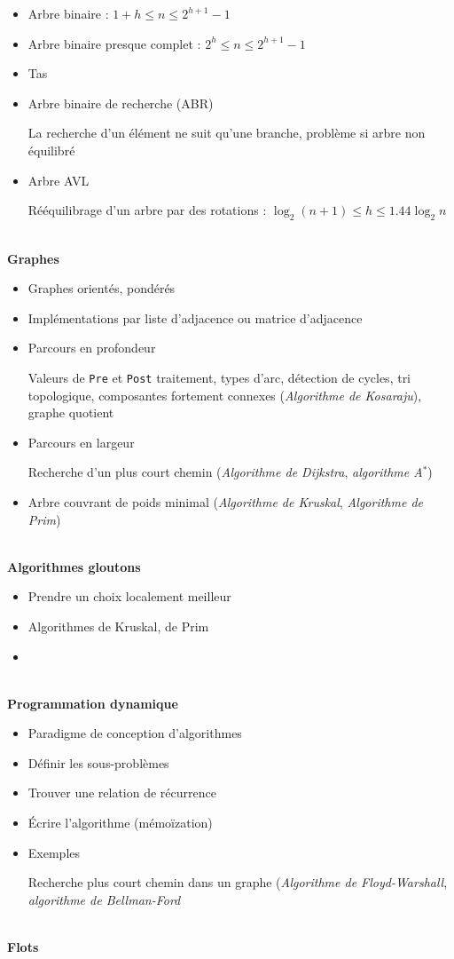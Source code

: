 \documentclass[10pt,a4paper]{article}
\newcommand{\cat}[1]{\noindent \textbf{\Large #1}}
\begin{document}
%
\begin{itemize}[noitemsep]
	\item Arbre binaire : \(  1+h \leq n \leq 2^{h+1}-1  \)
	\item Arbre binaire presque complet : %
		\(  2^h \leq n \leq 2^{h+1}-1  \)
	\item Tas
	\item Arbre binaire de recherche (ABR)
	
		La recherche d'un élément ne suit qu'une branche, problème si arbre non équilibré
	\item Arbre AVL
	
		Rééquilibrage d'un arbre par des rotations :
		\(  \log _2(n+1) \leq h \leq 1.44\log _2 n  \)
	
\end{itemize}
%
~ \\


\cat{Graphes}

%
\begin{itemize}[noitemsep]
	\item Graphes orientés, pondérés
	\item Implémentations par liste d'adjacence ou matrice d'adjacence
	\item Parcours en profondeur
	
		Valeurs de \texttt{Pre} et \texttt{Post} traitement, types d'arc, détection de cycles, tri topologique, composantes fortement  connexes (\emph{Algorithme de Kosaraju}), graphe quotient
	\item Parcours en largeur
	
		Recherche d'un plus court chemin (\emph{Algorithme de Dijkstra}, \emph{algorithme A\(^*\)})
	\item Arbre couvrant de poids minimal (\emph{Algorithme de Kruskal}, \emph{Algorithme de Prim})
\end{itemize}
%
~ \\


\cat{Algorithmes gloutons}

\begin{itemize}[noitemsep]
	\item Prendre un choix localement meilleur
	\item Algorithmes de Kruskal, de Prim
	\item 
\end{itemize}
~ \\


\cat{Programmation dynamique}

\begin{itemize}[noitemsep]
	\item Paradigme de conception d'algorithmes
	\item Définir les sous-problèmes
	\item Trouver une relation de récurrence
	\item Écrire l'algorithme (mémoïzation)
	\item Exemples
	
		Recherche plus court chemin dans un graphe (\emph{Algorithme de Floyd-Warshall}, \emph{algorithme de Bellman-Ford}
\end{itemize}
~ \\


\cat{Flots}
\end{document}
